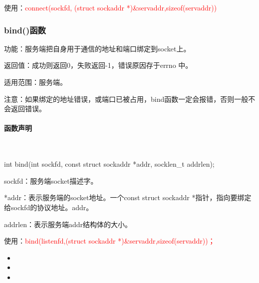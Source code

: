 \documentclass[UTF8]{article}%
\begin{document}
使用：\textcolor{red}{connect(sockfd, (struct sockaddr *)\&servaddr,sizeof(servaddr))}

\subsubsection{bind()函数}

功能：服务端把自身用于通信的地址和端口绑定到socket上。

返回值：成功则返回0，失败返回-1，错误原因存于errno 中。

适用范围：服务端。

注意：如果绑定的地址错误，或端口已被占用，bind函数一定会报错，否则一般不会返回错误。

\paragraph{函数声明}~{}

int bind(int sockfd, const struct sockaddr *addr, socklen\_t addrlen);

sockfd：服务端socket描述字。

*addr：表示服务端的socket地址。一个const struct sockaddr *指针，指向要绑定给sockfd的协议地址。addr。

addrlen：表示服务端addr结构体的大小。

使用：\textcolor{red}{bind(listenfd,(struct sockaddr *)\&servaddr,sizeof(servaddr))；}








\begin{itemize}
    \item 
    \item 
    \item 
\end{itemize}
\end{document}
